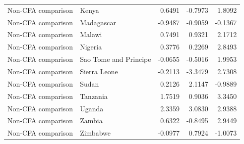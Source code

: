\begin{table}
\begin{tabular}[t]{llrrr}
Non-CFA comparison & Kenya & 0.6491 & -0.7973 & 1.8092\\
\addlinespace
Non-CFA comparison & Madagascar & -0.9487 & -0.9059 & -0.1367\\
Non-CFA comparison & Malawi & 0.7491 & 0.9321 & 2.1712\\
Non-CFA comparison & Nigeria & 0.3776 & 0.2269 & 2.8493\\
Non-CFA comparison & Sao Tome and Principe & -0.0655 & -0.5016 & 1.9953\\
Non-CFA comparison & Sierra Leone & -0.2113 & -3.3479 & 2.7308\\
\addlinespace
Non-CFA comparison & Sudan & 0.2126 & 2.1147 & -0.9889\\
Non-CFA comparison & Tanzania & 1.7519 & 0.9036 & 3.3450\\
Non-CFA comparison & Uganda & 2.3359 & 3.0830 & 2.9388\\
Non-CFA comparison & Zambia & 0.6322 & -0.8495 & 2.9449\\
Non-CFA comparison & Zimbabwe & -0.0977 & 0.7924 & -1.0073\\
\bottomrule
\end{tabular}
\end{table}